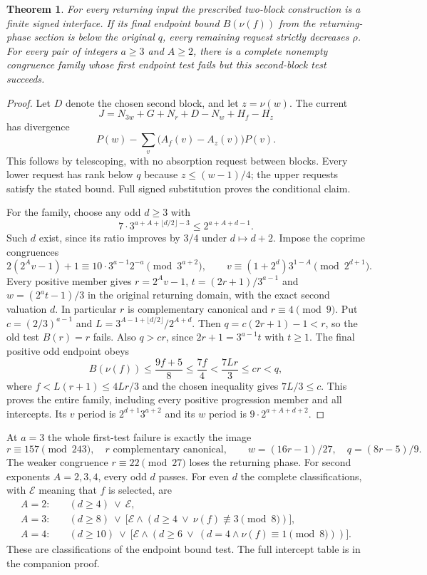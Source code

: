 \documentclass[11pt]{article}
\newtheorem{theorem}{Theorem}
\begin{document}
\begin{theorem}\label{thm:secondreturning}
For every returning input the prescribed two-block construction is a
finite signed interface. If its final endpoint bound $B(\nu(f))$ from
the returning-phase section is below the original $q$, every remaining
request strictly decreases $\rho$. For every pair of integers $a\ge3$
and $A\ge2$, there is a complete nonempty congruence family whose first
endpoint test fails but this second-block test succeeds.
\end{theorem}
\begin{proof}
Let $D$ denote the chosen second block, and let $z=\nu(w)$. The current
\[
 J=N_{3w}+G+N_r+D-N_w+H_f-H_z
\]
has divergence
\[
 P(w)-\sum_v\bigl(A_f(v)-A_z(v)\bigr)P(v).
\]
This follows by telescoping, with no absorption request between blocks.
Every lower request has rank below $q$ because $z\le(w-1)/4$; the
upper requests satisfy the stated bound. Full signed substitution proves
the conditional claim.

For the family, choose any odd $d\ge3$ with
\[
 7\cdot3^{a+A+\lfloor d/2\rfloor-3}\le2^{a+A+d-1}.
\]
Such $d$ exist, since its ratio improves by $3/4$ under $d\mapsto d+2$.
Impose the coprime congruences
\[
 2(2^Av-1)+1\equiv10\cdot3^{a-1}2^{-a}\pmod{3^{a+2}},\qquad
 v\equiv(1+2^d)3^{1-A}\pmod{2^{d+1}}.
\]
Every positive member gives $r=2^Av-1$, $t=(2r+1)/3^{a-1}$ and
$w=(2^at-1)/3$ in the original returning domain, with the exact second
valuation $d$. In particular $r$ is complementary canonical and
$r\equiv4\pmod9$. Put $c=(2/3)^{a-1}$ and
$L=3^{A-1+\lfloor d/2\rfloor}/2^{A+d}$. Then
$q=c(2r+1)-1<r$, so the old test $B(r)=r$ fails. Also $q>cr$, since
$2r+1=3^{a-1}t$ with $t\ge1$. The final positive odd endpoint obeys
\[
 B(\nu(f))\le\frac{9f+5}{8}\le\frac{7f}{4}
 <\frac{7Lr}{3}\le cr<q,
\]
where $f<L(r+1)\le4Lr/3$ and the chosen inequality gives $7L/3\le c$.
This proves the entire family, including every positive progression
member and all intercepts. Its $v$ period is $2^{d+1}3^{a+2}$ and
its $w$ period is $9\cdot2^{a+A+d+2}$.
\end{proof}

At $a=3$ the whole first-test failure is exactly the image
\[
 r\equiv157\pmod{243},\quad r\text{ complementary canonical},
 \qquad w=(16r-1)/27,\quad q=(8r-5)/9.
\]
The weaker congruence $r\equiv22\pmod{27}$ loses the returning phase.
For second exponents $A=2,3,4$, every odd $d$ passes. For even $d$ the
complete classifications, with $\mathcal E$ meaning that $f$ is selected,
are
\[
\begin{aligned}
 A=2:&\quad (d\ge4)\ \lor\ \mathcal E,\\
 A=3:&\quad (d\ge8)\ \lor\
  \bigl[\mathcal E\land(d\ge4\ \lor\ \nu(f)\not\equiv3\pmod8)\bigr],\\
 A=4:&\quad (d\ge10)\ \lor\
  \bigl[\mathcal E\land(d\ge6\ \lor\
    (d=4\land\nu(f)\equiv1\pmod8))\bigr].
\end{aligned}
\]
These are classifications of the endpoint
bound test. The full intercept table is in the companion proof.
\end{document}
